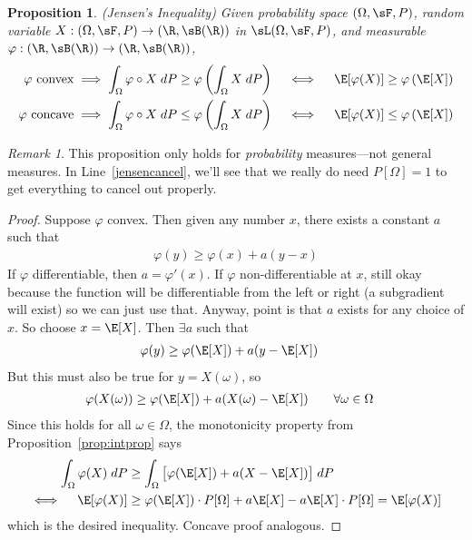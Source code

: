 \documentclass[12pt]{article}
\theoremstyle{plain}
\newtheorem{prop}[thm]{Proposition}
\theoremstyle{definition}
\theoremstyle{remark}
\newtheorem*{rmk}{Remark}
\newcommand{\ra}{\rightarrow}
\begin{document}
\begin{prop}{\emph{(Jensen's Inequality)}}
Given probability space $(\Omega,\sF,P)$, random variable
$X:(\Omega,\sF,P)\ra(\R,\sB(\R))$ in $\sL(\Omega,\sF,P)$, and measurable
$\varphi:(\R,\sB(\R))\ra(\R,\sB(\R))$,
\begin{align*}
  \text{$\varphi$ convex} &\implies
  \int_\Omega \varphi\circ X \; dP
  \geq
  \varphi\left(\int_\Omega X \; dP\right)
  \quad\iff\quad
  \E[\varphi(X)] \geq \varphi\left(\E[X]\right) \\
  \text{$\varphi$ concave} &\implies
  \int_\Omega \varphi\circ X \; dP
  \leq
  \varphi\left(\int_\Omega X \; dP\right)
  \quad\iff\quad
  \E[\varphi(X)] \leq \varphi\left(\E[X]\right)
\end{align*}
\end{prop}
\begin{rmk}
This proposition only holds for \emph{probability} measures---not
general measures.
In Line~\ref{jensencancel}, we'll see that we really do need
$P[\Omega]=1$ to get everything to cancel out properly.
\end{rmk}
\begin{proof}
Suppose $\varphi$ convex. Then given any number $x$, there exists a constant
$a$ such that
\begin{align*}
  \varphi(y) \geq \varphi(x) + a (y-x)
\end{align*}
If $\varphi$ differentiable, then $a=\varphi'(x)$. If $\varphi$ non-differentiable at
$x$, still okay because the function will be differentiable from the
left or right (a subgradient will exist)
so we can just use that.
Anyway, point is that $a$ exists for any choice of $x$.
So choose $x=\E[X]$. Then $\exists a$ such that
\begin{align*}
  \varphi(y) &\geq \varphi(\E[X]) + a (y-\E[X])
\end{align*}
But this must also be true for $y=X(\omega)$, so
\begin{align*}
  \varphi(X(\omega)) &\geq \varphi(\E[X]) + a (X(\omega)-\E[X])
  \qquad \forall \omega\in\Omega
\end{align*}
Since this holds for all $\omega\in\Omega$,
the monotonicity property from Proposition~\ref{prop:intprop} says
\begin{align}
  \int_\Omega \varphi(X)
  \; dP
  &\geq
  \int_\Omega
  \big[
  \varphi(\E[X]) + a (X-\E[X])
  \big]
  \; dP
  \notag
  \\
  \iff\quad
  \E[\varphi(X)]
  &\geq \varphi(\E[X])\cdot P[\Omega] + a \E[X] - a\E[X]\cdot P[\Omega]
  = \E[\varphi(X)]
  \label{jensencancel}
\end{align}
which is the desired inequality.
Concave proof analogous.
\end{proof}
\end{document}
